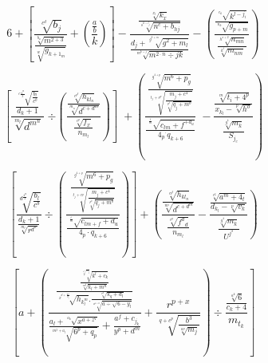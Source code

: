 \documentclass[aspectratio=169]{beamer}
\begin{document}

\begin{frame}
\fontsize{60pt}{60pt}

$$ 6+\left[\frac{\sqrt[c^d]{b_j}}{\frac{\sqrt[b_x]{m^{2+3}}}{\sqrt[w]{g_{{k+1}_m}}}}+\left(\frac{\frac{a}{b}}{k}  \right)\right]-\frac{\frac{\sqrt[x_l]{k_x}}{\sqrt[s^{{k-l}_j}]{n^c+b_{hj}}}}{\frac{d_j+\sqrt[g^{h+m}]{g^2+m_l}} {\sqrt[m^{k\div j}] {m^{2\cdot n}\div jk}}} -\left( \frac{\frac{\sqrt[c_k \ \  \ \ \ ]{k^{l-j_i}}}{\sqrt[n_k \ \  \ \ \ ]{g_{p+m}}}}{\frac{\sqrt[h^{x+2}]{n_{mn}}}{\sqrt[k^t]{m_{nm}}}} \right) $$

\end{frame}


\begin{frame}
\fontsize{60pt}{60pt}

$$\left[ \frac{\frac{\sqrt[c\frac{4^m}{3} \ \  \ \ ]{\frac{b_l}{c^b}}}{d_k+1}}{\sqrt[m_l]{d^{m^n}}}\; \text{÷} \left( \frac{\frac{\sqrt[c^{p^q}]{h_{kl_n}}}{\sqrt[m_n]{d^{c+d^m}}}}{\frac{\sqrt[c^p]{f_x}}{n_{m_l}}}\right)\right] \; + \left(	\frac{\frac{\sqrt[g^{4+p}]{m^6+p_g}}{\sqrt[t_j+c^p]{\frac{m_j+c^4}{\sqrt[p^b]{q_j+m^b}}}}}{\frac{\sqrt[\frac{t}{m} \ \  \ \ \ ]{c_{lm} + f^{+d_u}}}{{4_p}^.q_{k+6}}}	\; - \frac{\frac{\sqrt[m]{t_i+4^p}}{x_{k_l}-\sqrt[p]{h^o}}}{\frac{\sqrt[g^4]{m_k}}{S_{j_e}}} 	\right)$$

\end{frame}


\begin{frame}
\fontsize{60pt}{60pt}


$$\left[ \frac{\sqrt[d^{\frac{4^m}{3}}]{\frac{b_l}{c^b}}}{\frac{d_k + 1}{\sqrt[m_l]{r^{d^n}}}} 
\div \left( 
\frac{\frac{\sqrt[g^{4+p}]{m^6+p_g}}{\sqrt[t_j+c^p]{\frac{m_j+c^4}{\sqrt[p^b]{q_j+m^b}}}}}{\frac{\sqrt[\frac{t}{m} \ \  \ \ \ ]{c_{lm+f}+d_u}}{4_p\cdot q_{k+6}}} \right) 
\right] 
+ 
\left( \frac{\frac{\sqrt[c^{p^q}]{h_{kl_{n}}}}{\sqrt[m^i]{d^{c+d^m}}}}
{\frac{\sqrt[c^p]{f^d \phantom{}_d}}{n_{m_l}}}
-
\frac{\frac{\sqrt[c^6]{a^m+4_t}}{d_{k_l}-\sqrt[p]{v_k}}}{\frac{\sqrt[g^4]{m_k}}{U^{j^s}}}
\right)$$

\end{frame}


\begin{frame}
\fontsize{60pt}{60pt}

  $$ \left[ a+ \left( \frac{\frac{\frac{\sqrt[{\sqrt[a^p]{m_j} }]{k^l+c_k}{}}{\sqrt[m^d]{k_l+m^n}}}{\sqrt[x^{d+\frac{m^n}{a_j}} \ \ \ ]{h_{k_l^m}}.\frac{\sqrt[c^a]{k_q+d_l}}{\sqrt[a^{6+a}]{a\div\sqrt{6-y_l}}}}}{\frac{a_l+\sqrt[a_k \ \ \ \ \ ]{x^{a+z^q}}}{\sqrt[m^3+a_l \ \ \ \ \ ]{6^p+q_p}}+\frac{a^f+c_{j_k}}{y^p+d^m}}+\frac{r^{p+x}}{\sqrt[q+c^p]{\frac{b^3}{\sqrt[a^p]{m_j}}}} \right) \div \frac{\frac{\sqrt[a^k]{6}}{c_k+4}}{m_{t_k}} \right] $$ 

\end{frame}
\end{document}
